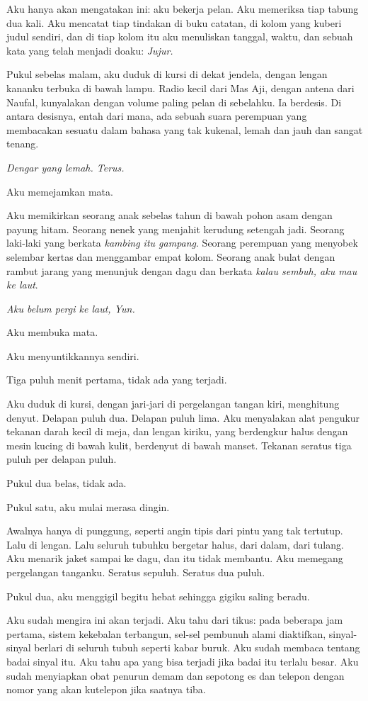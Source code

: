 \documentclass[11pt,twoside,openany]{book}
\makeatletter
\newcommand{\scenebreak}{\par\vspace{0.9em}{\centering\textsc{*\hspace{0.7em}*\hspace{0.7em}*}\par}\vspace{0.9em}\@afterindentfalse\@afterheading}
\makeatother
\begin{document}
Aku hanya akan mengatakan ini: aku bekerja pelan. Aku memeriksa tiap tabung dua kali. Aku mencatat tiap tindakan di buku catatan, di kolom yang kuberi judul sendiri, dan di tiap kolom itu aku menuliskan tanggal, waktu, dan sebuah kata yang telah menjadi doaku: \emph{Jujur.}

Pukul sebelas malam, aku duduk di kursi di dekat jendela, dengan lengan kananku terbuka di bawah lampu. Radio kecil dari Mas Aji, dengan antena dari Naufal, kunyalakan dengan volume paling pelan di sebelahku. Ia berdesis. Di antara desisnya, entah dari mana, ada sebuah suara perempuan yang membacakan sesuatu dalam bahasa yang tak kukenal, lemah dan jauh dan sangat tenang.

\emph{Dengar yang lemah. Terus.}

Aku memejamkan mata.

Aku memikirkan seorang anak sebelas tahun di bawah pohon asam dengan payung hitam. Seorang nenek yang menjahit kerudung setengah jadi. Seorang laki-laki yang berkata \emph{kambing itu gampang}. Seorang perempuan yang menyobek selembar kertas dan menggambar empat kolom. Seorang anak bulat dengan rambut jarang yang menunjuk dengan dagu dan berkata \emph{kalau sembuh, aku mau ke laut}.

\emph{Aku belum pergi ke laut, Yun.}

Aku membuka mata.

Aku menyuntikkannya sendiri.

\scenebreak
Tiga puluh menit pertama, tidak ada yang terjadi.

Aku duduk di kursi, dengan jari-jari di pergelangan tangan kiri, menghitung denyut. Delapan puluh dua. Delapan puluh lima. Aku menyalakan alat pengukur tekanan darah kecil di meja, dan lengan kiriku, yang berdengkur halus dengan mesin kucing di bawah kulit, berdenyut di bawah manset. Tekanan seratus tiga puluh per delapan puluh.

Pukul dua belas, tidak ada.

Pukul satu, aku mulai merasa dingin.

Awalnya hanya di punggung, seperti angin tipis dari pintu yang tak tertutup. Lalu di lengan. Lalu seluruh tubuhku bergetar halus, dari dalam, dari tulang. Aku menarik jaket sampai ke dagu, dan itu tidak membantu. Aku memegang pergelangan tanganku. Seratus sepuluh. Seratus dua puluh.

Pukul dua, aku menggigil begitu hebat sehingga gigiku saling beradu.

Aku sudah mengira ini akan terjadi. Aku tahu dari tikus: pada beberapa jam pertama, sistem kekebalan terbangun, sel-sel pembunuh alami diaktifkan, sinyal-sinyal berlari di seluruh tubuh seperti kabar buruk. Aku sudah membaca tentang badai sinyal itu. Aku tahu apa yang bisa terjadi jika badai itu terlalu besar. Aku sudah menyiapkan obat penurun demam dan sepotong es dan telepon dengan nomor yang akan kutelepon jika saatnya tiba.
\end{document}
